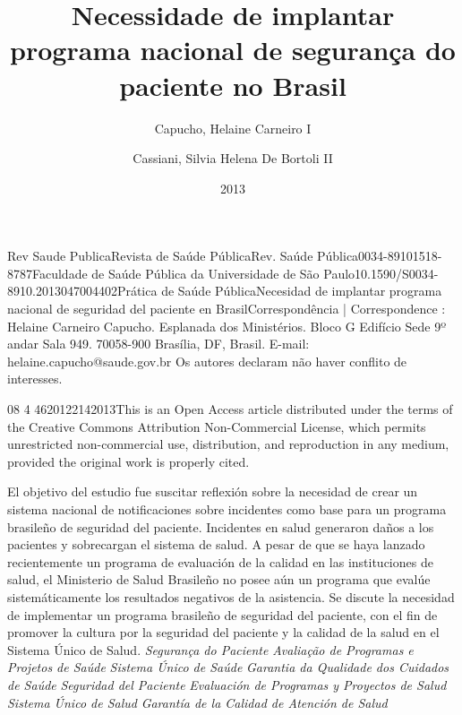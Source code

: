 \documentclass{article}
\begin{document}
\title{Necessidade de implantar programa nacional de segurança do
paciente no Brasil}
\author[I]{Capucho, Helaine Carneiro
I}
\author[II]{Cassiani, Silvia Helena De Bortoli
II}

\maketitle

Rev Saude PublicaRevista de Saúde PúblicaRev. Saúde
Pública0034-89101518-8787Faculdade de Saúde Pública da Universidade de São
Paulo10.1590/S0034-8910.2013047004402Prática de Saúde PúblicaNecesidad de
implantar programa nacional de seguridad del paciente en
BrasilCorrespondência | Correspondence : Helaine Carneiro Capucho. Esplanada dos
Ministérios. Bloco G Edifício Sede 9º andar Sala 949. 70058-900 Brasília, DF,
Brasil.
E-mail: helaine.capucho@saude.gov.br
Os autores declaram não haver conflito de interesses.
\date{2013}{08}{}
\newcommand{\volume}{47}
4\newcommand{\fpage}{791}
\newcommand{\lpage}{798}
4620122142013This is an Open Access article distributed under the terms of the
Creative
Commons Attribution Non-Commercial License, which permits unrestricted
non-commercial
use, distribution, and reproduction in any medium, provided the original work is
properly cited.

El objetivo del estudio fue suscitar reflexión sobre la necesidad de crear un
sistema
nacional de notificaciones sobre incidentes como base para un programa brasileño
de
seguridad del paciente. Incidentes en salud generaron daños a los pacientes y
sobrecargan
el sistema de salud. A pesar de que se haya lanzado recientemente un programa de
evaluación de la calidad en las instituciones de salud, el Ministerio de Salud
Brasileño
no posee aún un programa que evalúe sistemáticamente los resultados negativos de
la
asistencia. Se discute la necesidad de implementar un programa brasileño de
seguridad del
paciente, con el fin de promover la cultura por la seguridad del paciente y la
calidad de
la salud en el Sistema Único de Salud.
\textit{Segurança do Paciente}
\textit{Avaliação de Programas e Projetos de Saúde}
\textit{Sistema Único de Saúde}
\textit{Garantia da Qualidade dos Cuidados de Saúde}
\textit{Seguridad del Paciente}
\textit{Evaluación de Programas y Proyectos de Salud}
\textit{Sistema Único de Salud}
\textit{Garantía de la Calidad de Atención de Salud}
\end{document}
